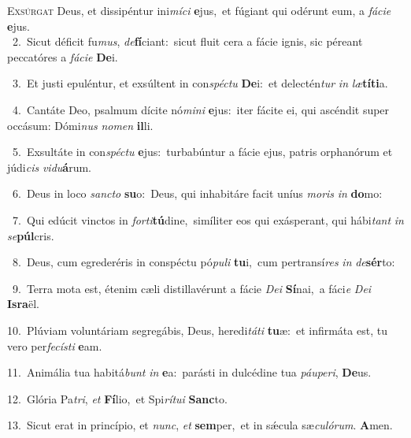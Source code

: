 \lettrine{\initial\textcolor{\initialcolor}{E}}{xsúrgat} Deus, et dissipéntur ini\-\textit{mí}\-\textit{ci} \textbf{e}\-jus,~\star et fúgiant qui odérunt eum, a \textit{fá}\-\textit{ci}\textit{e} \textbf{e}\-jus.\\
{\numbfont\textcolor{\numbcolor}{~2.}}~Sicut déficit fu\-\textit{mus}\-, \textit{de}\-\textbf{fí}ciant:~\star sicut fluit cera a fácie ignis, sic péreant peccatóres a \textit{fá}\-\textit{ci}\textit{e} \textbf{De}\-i.\par
{\numbfont\textcolor{\numbcolor}{~3.}}~Et justi epuléntur, et exsúltent in con\-\textit{spéc}\-\textit{tu} \textbf{De}\-i:~\star et delectén\textit{tur} \textit{in} \textit{læ}\-\textbf{tí}\textbf{ti}a.\par
{\numbfont\textcolor{\numbcolor}{~4.}}~Cantáte Deo, psalmum dícite nó\-\textit{mi}\-\textit{ni} \textbf{e}\-jus:~\star iter fácite ei, qui ascéndit super occásum: Dómi\textit{nus} \textit{no}\-\textit{men} \textbf{il}\-li.\par
{\numbfont\textcolor{\numbcolor}{~5.}}~Exsultáte in con\-\textit{spéc}\-\textit{tu} \textbf{e}\-jus:~\star turbabúntur a fácie ejus, patris orphanórum et júdi\textit{cis} \textit{vi}\-\textit{du}\textbf{á}rum.\par
{\numbfont\textcolor{\numbcolor}{~6.}}~Deus in loco \textit{sanc}\-\textit{to} \textbf{su}\-o:~\star Deus, qui inhabitáre facit uníus \textit{mo}\-\textit{ris} \textit{in} \textbf{do}\-mo:\par
{\numbfont\textcolor{\numbcolor}{~7.}}~Qui edúcit vinctos in \textit{for}\-\textit{ti}\textbf{tú}dine,~\star simíliter eos qui exásperant, qui hábi\textit{tant} \textit{in} \textit{se}\-\textbf{púl}cris.\par
{\numbfont\textcolor{\numbcolor}{~8.}}~Deus, cum egrederéris in conspéctu pó\-\textit{pu}\-\textit{li} \textbf{tu}\-i,~\star cum pertransí\textit{res} \textit{in} \textit{de}\-\textbf{sér}to:\par
{\numbfont\textcolor{\numbcolor}{~9.}}~Terra mota est, étenim cæli distillavérunt a fácie \textit{De}\-\textit{i} \textbf{Sí}\-nai,~\star a fáci\textit{e} \textit{De}\-\textit{i} \textbf{Is}\-\textbf{ra}ël.\par
{\numbfont\textcolor{\numbcolor}{10.}}~Plúviam voluntáriam segregábis, Deus, heredi\-\textit{tá}\-\textit{ti} \textbf{tu}\-æ:~\star et infirmáta est, tu vero per\-\textit{fe}\-\textit{cís}\textit{ti} \textbf{e}\-am.\par
{\numbfont\textcolor{\numbcolor}{11.}}~Animália tua habitá\textit{bunt} \textit{in} \textbf{e}\-a:~\star parásti in dulcédine tua \textit{páu}\-\textit{pe}\textit{ri}, \textbf{De}\-us.\par
{\numbfont\textcolor{\numbcolor}{12.}}~Glória Pa\-\textit{tri}\-, \textit{et} \textbf{Fí}\-lio,~\star et Spi\-\textit{rí}\-\textit{tu}\textit{i} \textbf{Sanc}\-to.\par
{\numbfont\textcolor{\numbcolor}{13.}}~Sicut erat in princípio, et \textit{nunc}\-, \textit{et} \textbf{sem}\-per,~\star et in sǽcula sæ\-\textit{cu}\-\textit{ló}\textit{rum}. \textbf{A}\-men.\par
